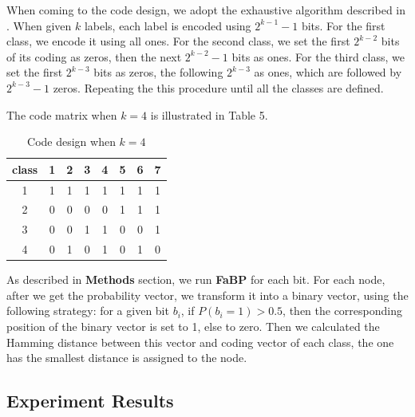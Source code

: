 When coming to the code design, we adopt the exhaustive algorithm described in \cite{Thomas1995}. When given $k$ labels, each label is encoded using $2^{k-1}-1$ bits. For the first class, we encode it using all ones. For the second class, we set the first $2^{k-2}$ bits of its coding as zeros, then the next $2^{k-2}-1$ bits as ones. For the third class, we set the first $2^{k-3}$ bits as zeros, the following $2^{k-3}$ as ones, which are followed by $2^{k-3}-1$ zeros. Repeating the this procedure until all the classes are defined. 

The code matrix when $k=4$ is illustrated in Table 5.

\begin{table}[!ht]
\centering
\begin{tabular}{c|ccccccc}
\toprule
\textbf{class} & 1 & 2 & 3 & 4 & 5 & 6 & 7\\
\midrule
1 & 1 & 1 & 1 & 1 & 1 & 1 & 1\\
2 & 0 & 0 & 0 & 0 & 1 & 1 & 1\\
3 & 0 & 0 & 1 & 1 & 0 & 0 & 1\\
4 & 0 & 1 & 0 & 1 & 0 & 1 & 0\\
\bottomrule
\end{tabular}
\caption{Code design when $k=4$}
\end{table}

As described in \textbf{Methods} section, we run \textbf{FaBP} for each bit. For each node, after we get the probability vector, we transform it into a binary vector, using the following strategy: for a given bit $b_i$, if $P(b_i=1) > 0.5$, then the corresponding position of the binary vector is set to 1, else to zero. Then we calculated the Hamming distance between this vector and coding vector of each class, the one has the smallest distance is assigned to the node. 

\subsection{Experiment Results}
